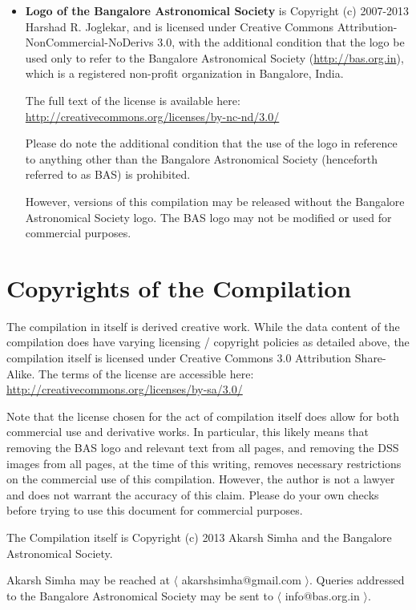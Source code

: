\begin{itemize}
\item \textbf{Logo of the Bangalore Astronomical Society} is Copyright
  (c) 2007-2013 Harshad R. Joglekar, and is licensed under Creative
  Commons Attribution-NonCommercial-NoDerivs 3.0, with the additional
  condition that the logo be used only to refer to the Bangalore
  Astronomical Society (\url{http://bas.org.in}), which is a
  registered non-profit organization in Bangalore, India. 

  The full text of the license is available here:
  \url{http://creativecommons.org/licenses/by-nc-nd/3.0/}

  Please do note the additional condition that the use of the logo in
  reference to anything other than the Bangalore Astronomical Society
  (henceforth referred to as BAS) is prohibited.

  However, versions of this compilation may be released without the
  Bangalore Astronomical Society logo. The BAS logo may not be
  modified or used for commercial purposes.

\end{itemize}

\section*{Copyrights of the Compilation}

The compilation in itself is derived creative work. While the data
content of the compilation does have varying licensing / copyright
policies as detailed above, the compilation itself is licensed under
Creative Commons 3.0 Attribution Share-Alike. The terms of the license
are accessible here:
\url{http://creativecommons.org/licenses/by-sa/3.0/}

Note that the license chosen for the act of compilation itself does
allow for both commercial use and derivative works. In particular,
this likely means that removing the BAS logo and relevant text from
all pages, and removing the DSS images from all pages, at the time of
this writing, removes necessary restrictions on the commercial use of
this compilation. However, the author is not a lawyer and does not
warrant the accuracy of this claim. Please do your own checks before
trying to use this document for commercial purposes.

The Compilation itself is Copyright (c) 2013 Akarsh Simha and the
Bangalore Astronomical Society.

Akarsh Simha may be reached at $\langle$ akarshsimha@gmail.com
$\rangle$. Queries addressed to the Bangalore Astronomical Society may
be sent to $\langle$ info@bas.org.in $\rangle$.

